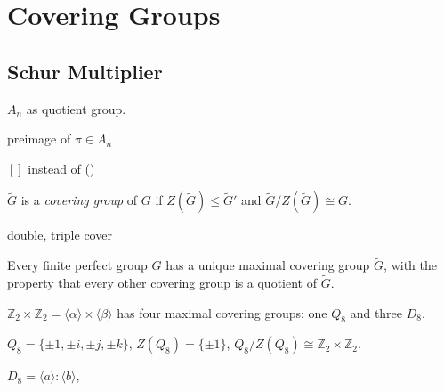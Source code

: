 \documentclass[a4paper,11pt]{article}
\def\maintitle#1{\section*{#1}}
\def\subtitle#1{\section{#1}}
\begin{document}
\else %
    \ifx\chaptitle\undefined %
        \def\maintitle#1{\subsection{#1}}
        \def\subtitle#1{\subsubsection{#1}}
    \else %
        \def\maintitle#1{\section{#1}}
        \def\subtitle#1{\subsection{#1}}
    \fi
\fi

\maintitle{Covering Groups}
\subtitle{Schur Multiplier}

$A_n$ as quotient group.

preimage of $\pi\in A_n$

$[]$ instead of ()

\begin{definition}
	$\tilde{G}$ is a \textit{covering group} of $G$ if $Z(\tilde{G})\leq \tilde{G}'$ and $\tilde{G}/Z(\tilde{G})\cong G$. 
\end{definition}

double, triple cover

\begin{theorem}
	Every finite perfect group $G$ has a unique maximal covering group $\tilde{G}$, with the property that every other covering group is a quotient of $\tilde{G}$.
\end{theorem}

\begin{example}
	$\mathbb{Z}_2\times\mathbb{Z}_2=\langle\alpha\rangle\times\langle\beta\rangle$ has four maximal covering groups: one $Q_8$ and three $D_8$.

    $Q_8=\{\pm 1,\pm i,\pm j,\pm k\}$, $Z(Q_8)=\{\pm 1\}$, $Q_8/Z(Q_8)\cong\mathbb{Z}_2\times\mathbb{Z}_2$.
    
    $D_8=\langle a\rangle:\langle b\rangle$,
\end{example}

\end{document}
